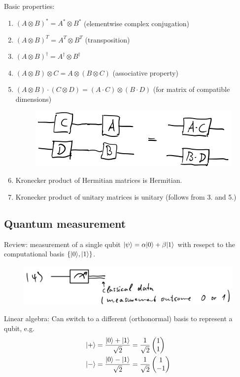 Basic properties:
\begin{enumerate}
    \item $(A \otimes B)^* = A^* \otimes B^*$ (elementwise complex conjugation)
    \item $(A \otimes B)^T = A^T \otimes B^T$ (transposition)
    \item $(A \otimes B)^\dag = A^\dag \otimes B^\dag$
    \item $(A \otimes B) \otimes C = A \otimes (B \otimes C)$ (associative property)
    \item $(A \otimes B) \cdot (C \otimes D) 
        = (A \cdot C) \otimes (B \cdot D)$ (for matrix of compatible dimensions)
        \begin{figure}[H]
            \centering
            \includegraphics[scale=0.5]{chapters/res/kronecker-properties.png}
        \end{figure}
    \item Kronecker product of Hermitian matrices is Hermitian.
    \item Kronecker product of unitary matrices is unitary (follows from 3. and 5.)
\end{enumerate}

\subsection{Quantum measurement}
Review: measurement of a single qubit $\lvert\psi\rangle = \alpha\lvert0\rangle + \beta{\lvert1\rangle}$ with
resepct to the computational basis $\{\lvert0\rangle, \lvert1\rangle\}$.

\begin{figure}[H]
    \centering
    \includegraphics[scale=0.5]{chapters/res/quantum-measurement.png}
\end{figure}

Linear algebra: Can switch to a different (orthonormal) basis to represent a qubit, e.g.
\begin{align*}
    \ket{+} &= \frac{\ket{0} + \ket{1}}{\sqrt{2}} = \frac{1}{\sqrt{2}} \begin{pmatrix*}1 \\ 1\end{pmatrix*} \\
    \ket{-} &= \frac{\ket{0} - \ket{1}}{\sqrt{2}} = \frac{1}{\sqrt{2}} \begin{pmatrix*}1 \\ -1\end{pmatrix*}
\end{align*}

